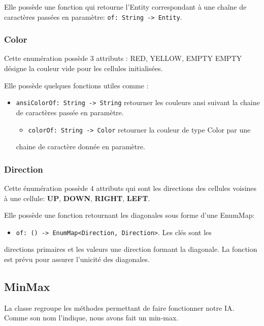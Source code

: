 \documentclass[11pt]{article}
\begin{document}
Elle possède une fonction qui retourne l'Entity correspondant à une
chaîne de caractères passées en paramètre: \texttt{of: String -> Entity}.

\subsubsection{Color\label{org45b2bfc}}
\label{sec:orgfca40d5}

Cette enumération possède 3 attributs : RED, YELLOW, EMPTY
EMPTY désigne la couleur vide pour les cellules initialisées.

Elle possède quelques fonctions utiles comme :

\begin{itemize}
\item \texttt{ansiColorOf: String -> String} retourner les couleurs ansi suivant la
chaine de caractères passée en paramètre.
\begin{itemize}
\item \texttt{colorOf: String -> Color} retourner la couleur de type Color par une
\end{itemize}
chaine de caractère donnée en paramètre.
\end{itemize}

\subsubsection{Direction\label{org5f5588b}}
\label{sec:org4e6396d}

Cette énumération possède 4 attributs qui sont les directions des
cellules voisines à une cellule: \textbf{UP}, \textbf{DOWN}, \textbf{RIGHT}, \textbf{LEFT}.

Elle possède une fonction retournant les diagonales sous forme d'une
EnumMap:

\begin{itemize}
\item \texttt{of: () -> EnumMap<Direction, Direction>}. Les clés sont les
\end{itemize}
directions primaires et les valeurs une direction formant la
diagonale. La fonction est prévu pour assurer l'unicité des diagonales.

\subsection{MinMax}
\label{sec:orgd3873b0}

La classe regroupe les méthodes permettant de faire fonctionner notre
IA. Comme son nom l'indique, nous avons fait un min-max.\\
\end{document}
